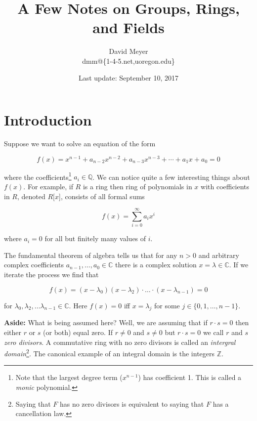 \documentclass[11pt, oneside]{article}   	%
\title{A Few Notes on Groups, Rings, and Fields}
\author{David Meyer \\ dmm@\{1-4-5.net,uoregon.edu\}}
\date{Last update: September 10, 2017}							%
\theoremstyle{definition}
\begin{document}
\maketitle

\section{Introduction}
Suppose we want to solve an equation of the form

\begin{equation}
f(x) = x^{n-1} + a_{n-2}x^{n-2} + a_{n-3}x^{n-3} + \cdots + a_{1}x + a_0 = 0
\label{eqn:f(x)}
\end{equation}

\bigskip
\noindent
where the coefficients\footnote{Note that the largest degree term ($x^{n-1}$) has coefficient 1. This is called a \emph{monic} polynomial.}
$a_i \in \mathbb{Q}$.  We can notice quite a few interesting things about $f(x)$.  For example, if $R$ is a ring then ring of polynomials in $x$ 
with coefficients in $R$, denoted $R[x$],  consists of all formal sums

\begin{equation*}
f(x) = \sum\limits_{i = 0}^{\infty} a_ix^i
\end{equation*}

\bigskip
\noindent
where $a_i = 0$ for all but finitely many values of $i$.


\bigskip
\noindent
The fundamental theorem of algebra \cite{steed2014} tells us that for any $n > 0$ 
and arbitrary complex coefficients $a_{n-1}, \hdots, a_0 \in \mathbb{C}$ there is a complex solution
$x = \lambda \in \mathbb{C}$. If we iterate the process we find that 

\begin{equation}
f(x) = (x - \lambda_0)(x - \lambda_2) \cdot \hdots \cdot (x - \lambda_{n - 1}) = 0
\label{eqn:factorization}
\end{equation}

\bigskip
\noindent
for $\lambda_0, \lambda_2, \hdots \lambda_{n-1} \in \mathbb{C}$.  Here $f(x) = 0$ iff $x = \lambda_j$ for some
$j \in \{0,1,\hdots, n-1\}$.

\bigskip
\noindent
\textbf{Aside:} What is being assumed here? Well, we are assuming that if $r \cdot s = 0$ then either $r$ or $s$ (or both) equal zero. 
If $r \neq 0$ and $s \neq 0$ but $r \cdot  s = 0$ we call $r$ and $s$ \emph{zero divisors}. A commutative ring with no zero divisors
is called an \emph{intergral domain}\footnote{Saying that $F$ has no zero divisors is equivalent to saying that $F$ has a cancellation law.}. 
The canonical example of an integral domain is the integers $\mathbb{Z}$. 
\end{document}
